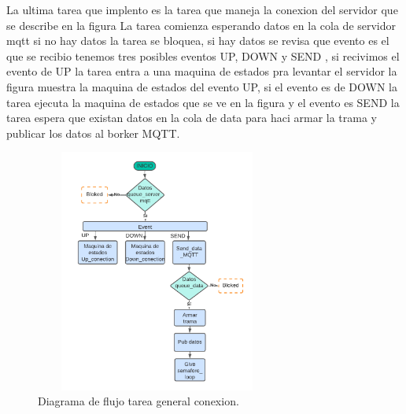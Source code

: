 La ultima tarea que implento es la tarea que maneja la conexion del servidor que se describe en la figura 
La tarea comienza esperando datos en la cola de servidor mqtt si no hay datos la tarea se bloquea, si hay datos se revisa que evento es el que se recibio tenemos tres posibles eventos UP, DOWN y SEND ,
si recivimos el evento de UP la tarea entra a una maquina de estados pra levantar el servidor la figura muestra la maquina de estados del evento UP, si el evento es de DOWN la tarea ejecuta la maquina de estados que se ve en la figura y el evento es SEND la tarea espera que existan datos en la cola de data para haci armar la trama y publicar los datos al borker MQTT.

\begin{figure}[htbp]
  \centering
	\includegraphics[width=8cm, height=8cm]{./Figures/DF general task conection.png}
	\caption{Diagrama de flujo tarea general conexion.}
	\label{fig:Df tarea conexion}
\end{figure}

